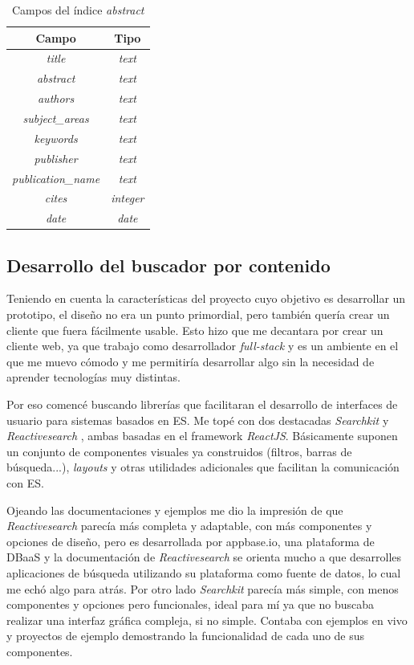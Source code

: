 \begin{table} [h!]
	\centering
	\begin{tabular}{| c | c |}
		\hline
		\textbf{Campo}             & \textbf{Tipo}    \\ \hline
		\textit{title}             & \textit{text}    \\
		\textit{abstract}          & \textit{text}    \\
		\textit{authors}           & \textit{text}    \\
		\textit{subject\_areas}    & \textit{text}    \\
		\textit{keywords}          & \textit{text}    \\
		\textit{publisher}         & \textit{text}    \\
		\textit{publication\_name} & \textit{text}    \\
		\textit{cites}             & \textit{integer} \\
		\textit{date}              & \textit{date}    \\ \hline
	\end{tabular}
	\caption{Campos del índice \textit{abstract}}
\end{table}


\subsection{Desarrollo del buscador por contenido}
Teniendo en cuenta la características del proyecto cuyo objetivo es desarrollar un prototipo, el diseño no era un punto primordial, pero también quería crear un cliente que fuera fácilmente usable. Esto hizo que me decantara por crear un cliente web, ya que trabajo como desarrollador \textit{full-stack} y es un ambiente en el que me muevo cómodo y me permitiría desarrollar algo sin la necesidad de aprender tecnologías muy distintas.

Por eso comencé buscando librerías que facilitaran el desarrollo de interfaces de usuario para sistemas basados en \acrshort{ES}. Me topé con dos destacadas \textit{Searchkit} \cite{searchKit} y \textit{Reactivesearch} \cite{reactiveSearch}, ambas basadas en el \gls{framework} \textit{ReactJS}. Básicamente suponen un conjunto de componentes visuales ya construidos (filtros, barras de búsqueda...), \textit{layouts} y otras utilidades adicionales que facilitan la comunicación con \acrshort{ES}.

Ojeando las documentaciones y ejemplos me dio la impresión de que \textit{Reactivesearch} parecía más completa y adaptable, con más componentes y opciones de diseño, pero es desarrollada por appbase.io, una plataforma de \acrshort{DBaaS} y la documentación de \textit{Reactivesearch} se orienta mucho a que desarrolles aplicaciones de búsqueda utilizando su plataforma como fuente de datos, lo cual me echó algo para atrás. Por otro lado \textit{Searchkit} parecía más simple, con menos componentes y opciones pero funcionales, ideal para mí ya que no buscaba realizar una interfaz gráfica compleja, si no simple. Contaba con ejemplos en vivo y proyectos de ejemplo demostrando la funcionalidad de cada uno de sus componentes.

